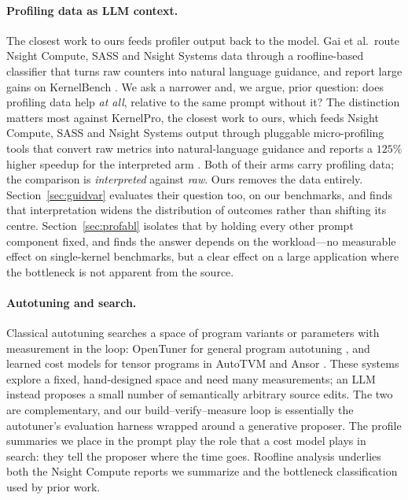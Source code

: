 \paragraph{Profiling data as LLM context.}
The closest work to ours feeds profiler output back to the model. Gai et al.\ route Nsight Compute,
SASS and Nsight Systems data through a roofline-based classifier that turns raw counters into natural
language guidance, and report large gains on KernelBench \cite{gai2026microprofiling}. We ask a
narrower and, we argue, prior question: does profiling data help \emph{at all}, relative to the same
prompt without it? The distinction matters most against KernelPro, the closest work to ours, which
feeds Nsight Compute, SASS and Nsight Systems output through pluggable micro-profiling tools that
convert raw metrics into natural-language guidance and reports a $125\%$ higher speedup for the
interpreted arm \cite{gai2026kernelpro}. Both of their arms carry profiling data; the comparison is
\emph{interpreted} against \emph{raw}. Ours removes the data entirely. Section~\ref{sec:guidvar}
evaluates their question too, on our benchmarks, and finds that interpretation widens the distribution
of outcomes rather than shifting its centre. Section~\ref{sec:profabl} isolates that by holding every other prompt component
fixed, and finds the answer depends on the workload---no measurable effect on single-kernel benchmarks,
but a clear effect on a large application where the bottleneck is not apparent from the source.

\paragraph{Autotuning and search.}
Classical autotuning searches a space of program variants or parameters with measurement in the loop:
OpenTuner for general program autotuning \cite{ansel2014opentuner}, and learned cost models for tensor
programs in AutoTVM \cite{chen2018autotvm} and Ansor \cite{zheng2020ansor}. These systems explore a
fixed, hand-designed space and need many measurements; an LLM instead proposes a small number of
semantically arbitrary source edits. The two are complementary, and our build--verify--measure loop is
essentially the autotuner's evaluation harness wrapped around a generative proposer. The profile
summaries we place in the prompt play the role that a cost model plays in search: they tell the
proposer where the time goes. Roofline analysis \cite{williams2009roofline} underlies both the
Nsight Compute reports we summarize and the bottleneck classification used by prior work.

